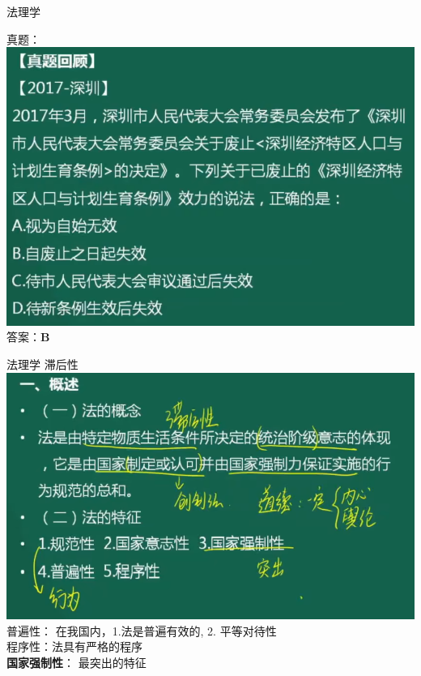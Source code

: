 \documentclass[aspectratio=169]{beamer}
\begin{document}
\begin{frame}[t]{法理学}

    真题：\\
    \includegraphics[scale=0.3]{17-1}\\ 
    答案：\textbf{B}\\
\end{frame}

\begin{frame}[t]{法理学}
    滞后性\\
    \includegraphics[scale=0.3]{law-intro}\\ 
    普遍性： 在我国内，1.法是普遍有效的, 2. 平等对待性\\
    程序性：法具有严格的程序\\
    \textbf{国家强制性}： 最突出的特征\\
\end{frame}
\end{document}
